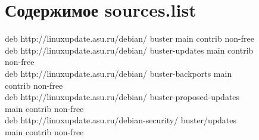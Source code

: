 \documentclass[a4paper,14pt]{extarticle}
\begin{document}
\begin{figure}[h]
\section{Содержимое sources.list}
\centering
\begin{flushleft}
deb http://linuxupdate.asu.ru/debian/ buster main contrib non-free\\
deb http://linuxupdate.asu.ru/debian/ buster-updates main contrib non-free\\
deb http://linuxupdate.asu.ru/debian/ buster-backports main contrib non-free\\
deb http://linuxupdate.asu.ru/debian/ buster-proposed-updates main contrib non-free\\
deb http://linuxupdate.asu.ru/debian-security/ buster/updates main contrib non-free\\
\end{flushleft}
\end{figure}









%
%    
\end{document}
